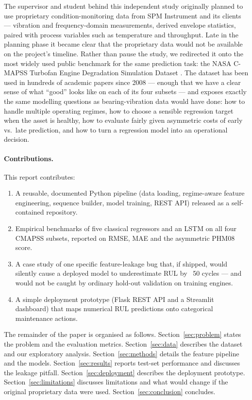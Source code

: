\documentclass[11pt,letterpaper]{article}
\begin{document}
The supervisor and student behind this independent study originally
planned to use proprietary condition-monitoring data from SPM
Instrument and its clients --- vibration and frequency-domain
measurements, derived envelope statistics, paired with process
variables such as temperature and throughput. Late in the planning
phase it became clear that the proprietary data would not be available
on the project's timeline. Rather than pause the study, we redirected
it onto the most widely used public benchmark for the same prediction
task: the NASA C-MAPSS Turbofan Engine Degradation Simulation Dataset
\citep{saxena2008cmapss}. The dataset has been used in hundreds of
academic papers since 2008 --- enough that we have a clear sense of
what ``good'' looks like on each of its four subsets --- and exposes
exactly the same modelling questions as bearing-vibration data would
have done: how to handle multiple operating regimes, how to choose a
sensible regression target when the asset is healthy, how to evaluate
fairly given asymmetric costs of early vs.~late prediction, and how to
turn a regression model into an operational decision.

\paragraph{Contributions.} This report contributes:
\begin{enumerate}[leftmargin=*, itemsep=2pt, topsep=2pt]
\item A reusable, documented Python pipeline (data loading, regime-aware
  feature engineering, sequence builder, model training, REST API)
  released as a self-contained repository.
\item Empirical benchmarks of five classical regressors and an LSTM on
  all four CMAPSS subsets, reported on RMSE, MAE and the asymmetric
  PHM08 score.
\item A case study of one specific feature-leakage bug that, if shipped,
  would silently cause a deployed model to underestimate RUL by ~50
  cycles --- and would not be caught by ordinary hold-out validation on
  training engines.
\item A simple deployment prototype (Flask REST API and a Streamlit
  dashboard) that maps numerical RUL predictions onto categorical
  maintenance actions.
\end{enumerate}

The remainder of the paper is organised as follows.
Section~\ref{sec:problem} states the problem and the evaluation metrics.
Section~\ref{sec:data} describes the dataset and our exploratory analysis.
Section~\ref{sec:methods} details the feature pipeline and the models.
Section~\ref{sec:results} reports test-set performance and discusses
the leakage pitfall.
Section~\ref{sec:deployment} describes the deployment prototype.
Section~\ref{sec:limitations} discusses limitations and what would
change if the original proprietary data were used.
Section~\ref{sec:conclusion} concludes.
\end{document}
